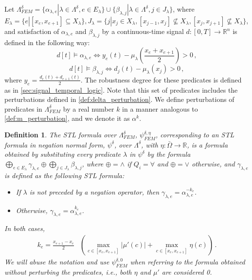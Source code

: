 \documentclass[letterpaper, 10 pt, conference]{ieeeconf/ieeeconf}
\newtheorem{definition}{Definition}
\newcommand*{\R}{\mathbb{R}}
\begin{document}
Let $\Lambda^{\delta}_{FEM} = \{\alpha_{\lambda, e} | \lambda \in
\Lambda^{\delta}, e \in E_{\lambda}\} \cup \{\beta_{\lambda, j} | \lambda \in
\Lambda^{\delta}, j \in J_{\lambda}\}$, where $E_{\lambda} = \{e | [x_e, x_{e+1}] \subseteq
X_{\lambda}\}, J_{\lambda} = \{j | x_j \in X_\lambda, [x_{j-1}, x_j] \not\subseteq
X_\lambda, [x_{j}, x_{j+1}] \not\subseteq X_\lambda \}$,
and satisfaction of $\alpha_{\lambda, e}$ and $\beta_{\lambda, j}$ by 
a continuous-time signal $d : [0, T] \to \R^n$
is defined in the following way:
%
\begin{equation}
    d[t] \models \alpha_{\lambda, e} \iff y_e(t) - 
    \mu_\lambda(\frac{x_e + x_{e + 1}}{2}) > 0 \,,
\end{equation}
%
\begin{equation}
     d[t] \models \beta_{\lambda, j} \iff d_j(t) - \mu_\lambda(x_j) > 0 \,,
\end{equation}
%
where $y_e = \frac{d_e(t) + d_{e+1}(t)}{2}$. The robustness degree for these
predicates is defined as in \cref{sec:signal_temporal_logic}.
Note that this set of predicates includes the perturbations defined in
\cref{def:delta_perturbation}. We define perturbations of predicates in
$\Lambda^{\delta}_{FEM}$ by a real number $k$ in a manner analogous to
\cref{def:m_perturbation}, and we denote it as $\alpha^k$.

\begin{definition} 
\label{def:eta_approximation}
    The STL formula over $\Lambda^{\delta}_{FEM}$, $\psi^{\delta, \eta}_{FEM}$, corresponding to an STL
    formula in negation normal form, $\psi^\delta$, over $\Lambda^\delta$, with
    $\eta : \bar\Omega \to \R$, is a formula obtained by substituting every
    predicate $\lambda$ in $\psi^\delta$ by the formula $\bigoplus_{e \in
    E_\lambda} \gamma_{\lambda,e} \oplus \bigoplus_{j \in J_\lambda} \beta_{\lambda, j}$, 
    where $\oplus = \wedge$ if $Q_i = \forall$ and $\oplus = \vee$
    otherwise, and $\gamma_{\lambda,e}$ is defined as the following STL formula:

    \begin{itemize}
        \item If $\lambda$ is not preceded by a negation operator, then
            $\gamma_{\lambda, e} = \alpha_{\lambda, e}^{-k_e}$.
        \item Otherwise, $\gamma_{\lambda, e} = \alpha_{\lambda, e}^{k_e}$.
    \end{itemize}

    In both cases, 
    \begin{equation}
    \begin{aligned}
        k_e = \frac{x_{e+1} - x_e}{2} & \left (\max_{c \in [x_e, x_{e+1}]}
        |\mu'(c)| + \max_{c \in [x_e, x_{e+1}]} \eta(c) \right ) \,.
    \end{aligned}
    \end{equation}
    We will abuse the notation and use $\psi^{\delta, 0}_{FEM}$ when referring
    to the formula obtained without perturbing the predicates, i.e., both $\eta$
    and $\mu'$ are considered 0.
\end{definition}
\end{document}
